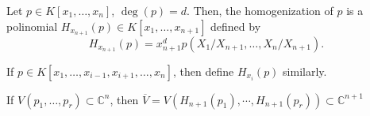 
\begin{defn}
	Let $p \in K[x_1, \dots, x_n]$,  $\deg(p) = d$. Then, the homogenization of $p$ is a polinomial $H_{x_{n+1}}(p) \in K[x_1, \dots, x_{n+1}]$ defined by \[
		H_{x_{n+1}}(p) = x_{n+1}^d p(X_1/X_{n+1}, \dots, X_n/X_{n+1}).
	\]

	If $p \in K[x_1, \dots, x_{i-1}, x_{i+1}, \dots, x_n]$, then define $H_{x_i}(p)$ similarly.
\end{defn}


\begin{lem}
	If $V(p_1, \dots, p_r) \subset \mathbb{C}^n$, then $\overline V = V(H_{n+1}(p_1), \cdots, H_{n+1}(p_r)) \subset \mathbb{C}^{n+1}$
\end{lem}
